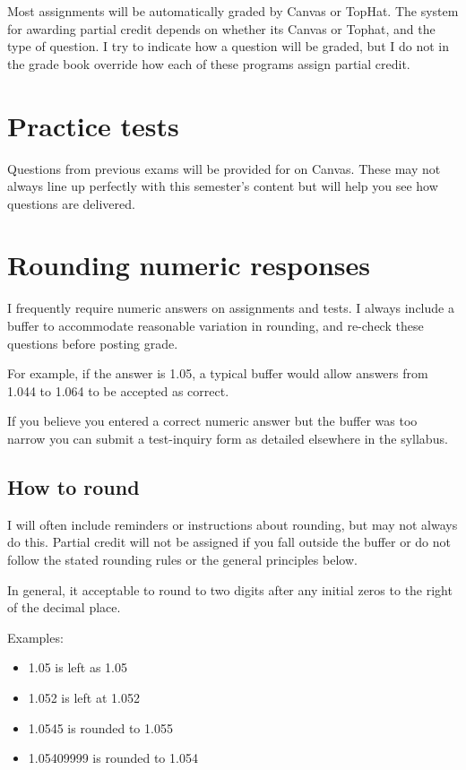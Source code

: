 \documentclass[
]{book}
\providecommand{\tightlist}{%
  \setlength{\itemsep}{0pt}\setlength{\parskip}{0pt}}
\begin{document}
Most assignments will be automatically graded by Canvas or TopHat. The system for awarding partial credit depends on whether its Canvas or Tophat, and the type of question. I try to indicate how a question will be graded, but I do not in the grade book override how each of these programs assign partial credit.

\hypertarget{practice-tests}{%
\chapter{Practice tests}\label{practice-tests}}

Questions from previous exams will be provided for on Canvas. These may not always line up perfectly with this semester's content but will help you see how questions are delivered.

\hypertarget{rounding-numeric-responses}{%
\chapter{Rounding numeric responses}\label{rounding-numeric-responses}}

I frequently require numeric answers on assignments and tests. I always include a buffer to accommodate reasonable variation in rounding, and re-check these questions before posting grade.

For example, if the answer is 1.05, a typical buffer would allow answers from 1.044 to 1.064 to be accepted as correct.

If you believe you entered a correct numeric answer but the buffer was too narrow you can submit a test-inquiry form as detailed elsewhere in the syllabus.

\hypertarget{how-to-round}{%
\section{How to round}\label{how-to-round}}

I will often include reminders or instructions about rounding, but may not always do this. Partial credit will not be assigned if you fall outside the buffer or do not follow the stated rounding rules or the general principles below.

In general, it acceptable to round to two digits after any initial zeros to the right of the decimal place.

Examples:

\begin{itemize}
\tightlist
\item
  1.05 is left as 1.05
\item
  1.052 is left at 1.052
\item
  1.0545 is rounded to 1.055
\item
  1.05409999 is rounded to 1.054
\end{itemize}
\end{document}
